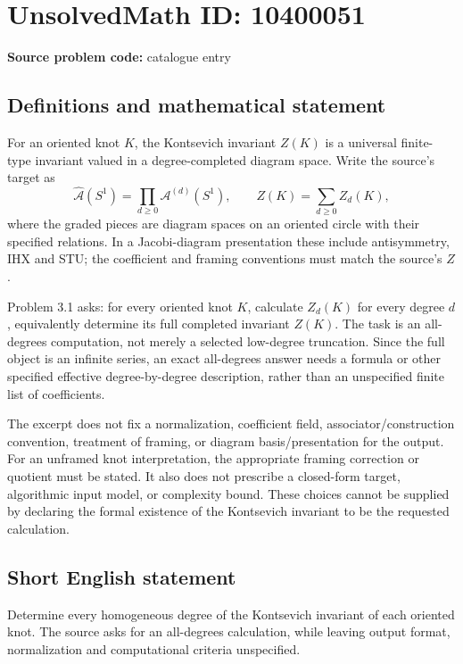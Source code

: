 \documentclass[11pt]{article}
\begin{document}
\section*{UnsolvedMath ID: 10400051}
\textbf{Source problem code:} catalogue entry
\subsection{Definitions and mathematical statement}
For an oriented knot \(K\), the Kontsevich invariant \(Z(K)\) is a universal finite-type invariant valued in a degree-completed diagram space. Write the source's target as
\[
 \widehat{\mathcal A}(S^1)=\prod_{d\geq0}\mathcal A^{(d)}(S^1),\qquad
 Z(K)=\sum_{d\geq0}Z_d(K),
\]
where the graded pieces are diagram spaces on an oriented circle with their specified relations. In a Jacobi-diagram presentation these include antisymmetry, IHX and STU; the coefficient and framing conventions must match the source's \(Z\).

Problem 3.1 asks: for every oriented knot \(K\), calculate \(Z_d(K)\) for every degree \(d\), equivalently determine its full completed invariant \(Z(K)\). The task is an all-degrees computation, not merely a selected low-degree truncation. Since the full object is an infinite series, an exact all-degrees answer needs a formula or other specified effective degree-by-degree description, rather than an unspecified finite list of coefficients.

The excerpt does not fix a normalization, coefficient field, associator/construction convention, treatment of framing, or diagram basis/presentation for the output. For an unframed knot interpretation, the appropriate framing correction or quotient must be stated. It also does not prescribe a closed-form target, algorithmic input model, or complexity bound. These choices cannot be supplied by declaring the formal existence of the Kontsevich invariant to be the requested calculation.
\subsection{Short English statement}
Determine every homogeneous degree of the Kontsevich invariant of each oriented knot. The source asks for an all-degrees calculation, while leaving output format, normalization and computational criteria unspecified.
\end{document}

